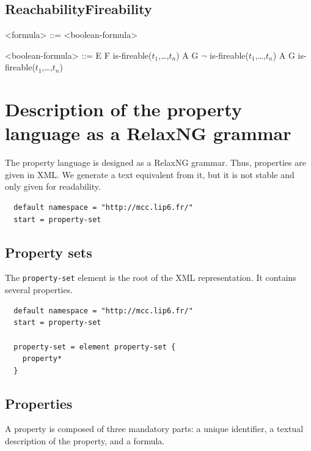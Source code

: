 \documentclass[10pt,english,a4paper]{article}
\begin{document}
\subsection{ReachabilityFireability}

\begin{grammar}

<formula> ::= <boolean-formula>

<boolean-formula> ::= E F is-fireable($t_1$,\dots,$t_n$)
\alt A G $\lnot$ is-fireable($t_1$,\dots,$t_n$)
\alt A G is-fireable($t_1$,\dots,$t_n$)

\end{grammar}


\section{Description of the property language as a RelaxNG grammar}
The property language is designed as a RelaxNG grammar. Thus, properties are given in XML.
We generate a text equivalent from it, but it is not stable and only given for readability.

\begin{lstlisting}
  default namespace = "http://mcc.lip6.fr/"
  start = property-set
\end{lstlisting}
\subsection{Property sets}
The \lstinline[language=xsd]!property-set! element is the root of the XML representation.
It contains several properties.
\begin{lstlisting}
  default namespace = "http://mcc.lip6.fr/"
  start = property-set

  property-set = element property-set {
    property*
  }
\end{lstlisting}

\subsection{Properties}
A property is composed of three mandatory parts: a unique identifier, a textual description
of the property, and a formula.
\end{document}
